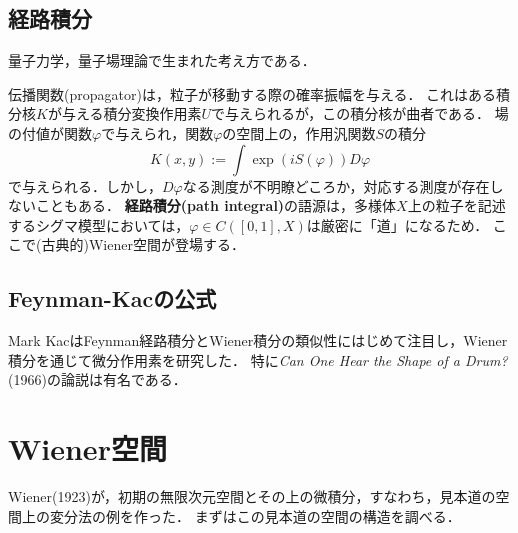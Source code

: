 \documentclass[uplatex,dvipdfmx]{jsreport}
\begin{document}
\subsection{経路積分}

\begin{tcolorbox}[colframe=ForestGreen, colback=ForestGreen!10!white,breakable,colbacktitle=ForestGreen!40!white,coltitle=black,fonttitle=\bfseries\sffamily,
title=]
    量子力学，量子場理論で生まれた考え方である．
\end{tcolorbox}

\begin{discussion}
    伝播関数(propagator)は，粒子が移動する際の確率振幅を与える．
    これはある積分核$K$が与える積分変換作用素$U$で与えられるが，この積分核が曲者である．
    場の付値が関数$\varphi$で与えられ，関数$\varphi$の空間上の，作用汎関数$S$の積分
    \[K(x,y):=\int\exp(iS(\varphi))D\varphi\]
    で与えられる．しかし，$D\varphi$なる測度が不明瞭どころか，対応する測度が存在しないこともある．
    \textbf{経路積分(path integral)}の語源は，多様体$X$上の粒子を記述するシグマ模型においては，$\varphi\in C([0,1],X)$は厳密に「道」になるため．
    ここで(古典的)Wiener空間が登場する．
\end{discussion}

\subsection{Feynman-Kacの公式}

\begin{tcolorbox}[colframe=ForestGreen, colback=ForestGreen!10!white,breakable,colbacktitle=ForestGreen!40!white,coltitle=black,fonttitle=\bfseries\sffamily,
title=]
    Mark KacはFeynman経路積分とWiener積分の類似性にはじめて注目し，Wiener積分を通じて微分作用素を研究した．
    特に\textit{Can One Hear the Shape of a Drum?} (1966)の論説は有名である．
\end{tcolorbox}

\section{Wiener空間}

\begin{tcolorbox}[colframe=ForestGreen, colback=ForestGreen!10!white,breakable,colbacktitle=ForestGreen!40!white,coltitle=black,fonttitle=\bfseries\sffamily,
title=]
    Wiener(1923)が，初期の無限次元空間とその上の微積分，すなわち，見本道の空間上の変分法の例を作った．
    まずはこの見本道の空間の構造を調べる．
\end{tcolorbox}
\end{document}
